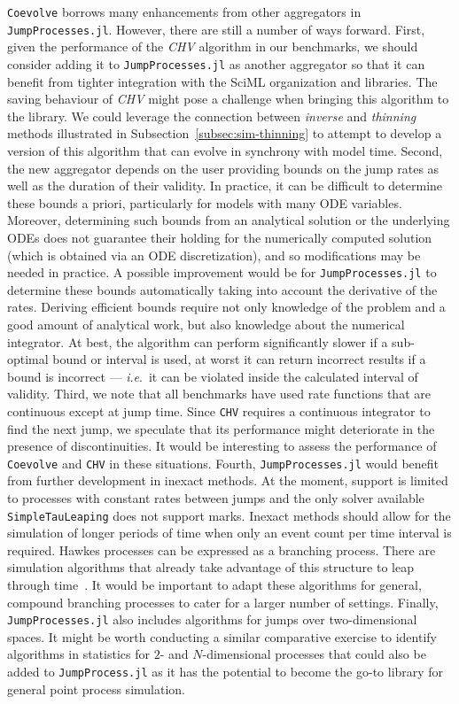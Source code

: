 \documentclass{juliacon}
\numberwithin{equation}{section}
\newcommand{\ie}{\textit{i}.\textit{e}.}
\begin{document}
\texttt{Coevolve} borrows many enhancements from other aggregators in \texttt{JumpProcesses.jl}. However, there are still a number of ways forward. First, given the performance of the \textit{CHV} algorithm in our benchmarks, we should consider adding it to \texttt{JumpProcesses.jl} as another aggregator so that it can benefit from tighter integration with the SciML organization and libraries. The saving behaviour of \textit{CHV} might pose a challenge when bringing this algorithm to the library. We could leverage the connection between \textit{inverse} and \textit{thinning} methods illustrated in Subsection~\ref{subsec:sim-thinning} to attempt to develop a version of this algorithm that can evolve in synchrony with model time. Second, the new aggregator depends on the user providing bounds on the jump rates as well as the duration of their validity. In practice, it can be difficult to determine these bounds a priori, particularly for models with many ODE variables. Moreover, determining such bounds from an analytical solution or the underlying ODEs does not guarantee their holding for the numerically computed solution (which is obtained via an ODE discretization), and so modifications may be needed in practice. A possible improvement would be for \texttt{JumpProcesses.jl} to determine these bounds automatically taking into account the derivative of the rates. Deriving efficient bounds require not only knowledge of the problem and a good amount of analytical work, but also knowledge about the numerical integrator. At best, the algorithm can perform significantly slower if a sub-optimal bound or interval is used, at worst it can return incorrect results if a bound is incorrect --- \ie~it can be violated inside the calculated interval of validity. Third, we note that all benchmarks have used rate functions that are continuous except at jump time. Since \texttt{CHV} requires a continuous integrator to find the next jump, we speculate that its performance might deteriorate in the presence of discontinuities. It would be interesting to assess the performance of \texttt{Coevolve} and \texttt{CHV} in these situations. Fourth, \texttt{JumpProcesses.jl} would benefit from further development in inexact methods. At the moment, support is limited to processes with constant rates between jumps and the only solver available \texttt{SimpleTauLeaping} does not support marks. Inexact methods should allow for the simulation of longer periods of time when only an event count per time interval is required. Hawkes processes can be expressed as a branching process. There are simulation algorithms that already take advantage of this structure to leap through time~\cite{laub2021}. It would be important to adapt these algorithms for general, compound branching processes to cater for a larger number of settings. Finally, \texttt{JumpProcesses.jl} also includes algorithms for jumps over two-dimensional spaces. It might be worth conducting a similar comparative exercise to identify algorithms in statistics for \(2 \)- and \( N \)-dimensional processes that could also be added to \texttt{JumpProcess.jl} as it has the potential to become the go-to library for general point process simulation.
\end{document}
